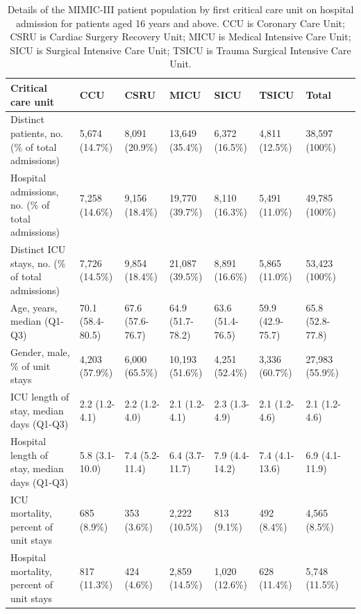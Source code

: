 \documentclass[english]{article}
\begin{document}


\begin{center}
\begin{table}
\begin{tabular}{|p{2.4cm}|p{1.2cm}|p{1.2cm}|p{1.2cm}|p{1.2cm}|p{1.2cm}|p{1.2cm}|p{1.2cm}|}
    \hline
    Critical care unit & CCU & CSRU & MICU & SICU & TSICU & Total \\
    \hline
    Distinct patients, no. (\% of total admissions) & 5,674 (14.7\%) & 8,091 (20.9\%) & 13,649 (35.4\%) & 6,372 (16.5\%) & 4,811 (12.5\%) & 38,597 (100\%) \\
    \hline
    Hospital admissions, no. (\% of total admissions) & 7,258 (14.6\%) & 9,156 (18.4\%) & 19,770 (39.7\%) & 8,110 (16.3\%) & 5,491 (11.0\%) & 49,785 (100\%) \\
    \hline
    Distinct ICU stays, no. (\% of total admissions) & 7,726 (14.5\%) & 9,854 (18.4\%) & 21,087 (39.5\%) & 8,891 (16.6\%) & 5,865 (11.0\%) & 53,423 (100\%) \\
    \hline
    Age, years, median (Q1-Q3) & 70.1 (58.4-80.5) & 67.6 (57.6-76.7) & 64.9 (51.7-78.2) & 63.6 (51.4-76.5) & 59.9 (42.9-75.7) & 65.8 (52.8-77.8) \\
    \hline
    Gender, male, \% of unit stays & 4,203 (57.9\%) & 6,000 (65.5\%) & 10,193 (51.6\%) & 4,251 (52.4\%) & 3,336 (60.7\%) & 27,983 (55.9\%) \\
    \hline
    ICU length of stay, median days (Q1-Q3) & 2.2 (1.2-4.1) & 2.2 (1.2-4.0) &  2.1 (1.2-4.1) & 2.3 (1.3-4.9) & 2.1 (1.2-4.6) & 2.1 (1.2-4.6) \\
    \hline
    Hospital length of stay, median days (Q1-Q3) & 5.8 (3.1-10.0) & 7.4 (5.2-11.4) & 6.4 (3.7-11.7) & 7.9 (4.4-14.2) & 7.4 (4.1-13.6) & 6.9 (4.1-11.9) \\
    \hline
    ICU mortality, percent of unit stays & 685 (8.9\%) & 353 (3.6\%) & 2,222 (10.5\%) & 813 (9.1\%) & 492 (8.4\%) & 4,565 (8.5\%) \\
    \hline
    Hospital mortality, percent of unit stays & 817 (11.3\%) & 424 (4.6\%) & 2,859 (14.5\%) &  1,020 (12.6\%) & 628 (11.4\%) & 5,748 (11.5\%) \\
    \hline
\end{tabular}
\caption{Details of the MIMIC-III patient population by first critical care unit on hospital admission for patients aged 16 years and above. CCU is Coronary Care Unit; CSRU is Cardiac Surgery Recovery Unit; MICU is Medical Intensive Care Unit; SICU is Surgical Intensive Care Unit; TSICU is Trauma Surgical Intensive Care Unit.}
\label{table:patientpopulation}
\end{table}
\end{center}
\end{document}
